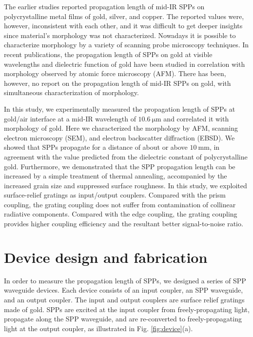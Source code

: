 \documentclass[aip,apl,reprint]{revtex4-1}
\begin{document}
The earlier studies reported propagation length of mid-IR SPPs on polycrystalline metal films of gold,\cite{McMullen, Schlesinger1, Schlesinger2} silver,\cite{Schlesinger1, Schlesinger2} and copper.\cite{Schoenwald, Shiba} The reported values were, however, inconsistent with each other, and it was difficult to get deeper insights since material's morphology was not characterized. Nowadays it is possible to characterize morphology by a variety of scanning probe microscopy techniques. In recent publications, the propagation length of SPPs on gold at visible wavelengths\cite{Kuttge} and dielectric function of gold\cite{Olmon, Trollmann} have been studied in correlation with morphology observed by atomic force microscopy (AFM). There has been, however, no report on the propagation length of mid-IR SPPs on gold, with simultaneous characterization of morphology.


In this study, we experimentally measured the propagation length of SPPs at gold/air interface at a mid-IR wavelength of $10.6\:\mathrm{\mu m}$ and correlated it with morphology of gold. Here we characterized the morphology by AFM, scanning electron microscopy (SEM), and electron backscatter diffraction (EBSD). We showed that SPPs propagate for a distance of about or above $10\:\mathrm{mm}$, in agreement with the value predicted from the dielectric constant of polycrystalline gold. Furthermore, we demonstrated that the SPP propagation length can be increased by a simple treatment of thermal annealing, accompanied by the increased grain size and suppressed surface roughness.
In this study, we exploited surface-relief gratings as input/output couplers. Compared with the prism coupling,\cite{Schoenwald, Shiba} the grating coupling does not suffer from contamination of collinear radiative components.\cite{Schlesinger1, Schlesinger2} Compared with the edge coupling,\cite{Schlesinger1, Schlesinger2} the grating coupling provides higher coupling efficiency and the resultant better signal-to-noise ratio. 

\section{Device design and fabrication}
\label{sec:device}
In order to measure the propagation length of SPPs, we designed a series of SPP waveguide devices. Each device consists of an input coupler, an SPP waveguide, and an output coupler.  The input and output couplers are surface relief gratings made of gold. SPPs are  excited at the input coupler from freely-propagating light, propagate along the SPP waveguide, and are re-converted to freely-propagating light at the output coupler, as illustrated in Fig. \ref{fig:device}(a). 
\end{document}
